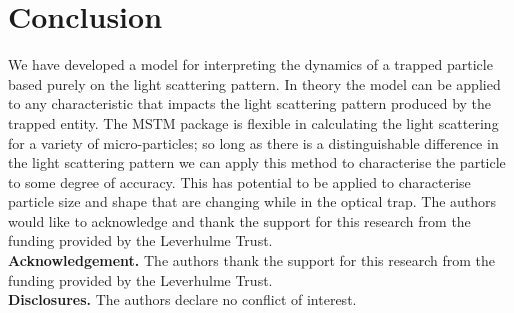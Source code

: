 \documentclass[final, 3p]{elsarticle}
\begin{document}
\section{Conclusion}
\label{sec:Conclusion}
We have developed a model for interpreting the dynamics of a trapped particle based purely on the light scattering pattern. In theory the model can be applied to any characteristic that impacts the light scattering pattern produced by the trapped entity. The MSTM package is flexible in calculating the light scattering for a variety of micro-particles; so long as there is a distinguishable difference in the light scattering pattern we can apply this method to characterise the particle to some degree of accuracy. This has potential to be applied to characterise particle size and shape that are changing while in the optical trap. The authors would like to acknowledge and thank the support for this research from the funding provided by the Leverhulme Trust.\\

\noindent \textbf{Acknowledgement.} The authors thank the support for this research from the funding provided by the Leverhulme Trust. \\
  
\noindent \textbf{Disclosures.} The authors declare no conflict of interest. \\


 


\newpage
\appendix
\onecolumn
\end{document}
